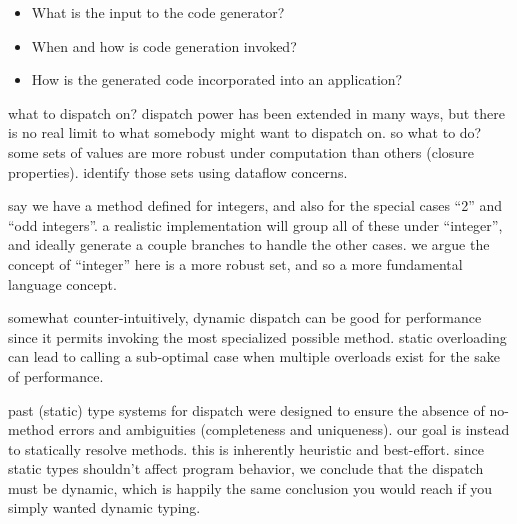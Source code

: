 \vspace{-2ex}
\begin{singlespace}
\begin{itemize}
\item What is the input to the code generator?
\item When and how is code generation invoked?
\item How is the generated code incorporated into an application?
\end{itemize}
\end{singlespace}




what to dispatch on? dispatch power has been extended in many ways, but
there is no real limit to what somebody might want to dispatch on.
so what to do?
some sets of values are more robust under computation than others
(closure properties).
identify those sets using dataflow concerns.

say we have a method defined for integers, and also for the special cases
``2'' and ``odd integers''. a realistic implementation
will group all of these under ``integer'', and ideally generate a couple
branches to handle the other cases. we argue the concept of ``integer''
here is a more robust set, and so a more fundamental language concept.


somewhat counter-intuitively, dynamic dispatch can be good for performance
since it permits invoking the most specialized possible method.
static overloading can lead to calling a sub-optimal case when multiple
overloads exist for the sake of performance.






past (static) type systems for dispatch were designed to ensure the absence of
no-method errors and ambiguities (completeness and uniqueness). our goal
is instead to statically resolve methods. this is inherently heuristic and
best-effort. since static types shouldn't affect program behavior, we
conclude that the dispatch must be dynamic, which is happily the same
conclusion you would reach if you simply wanted dynamic typing.

